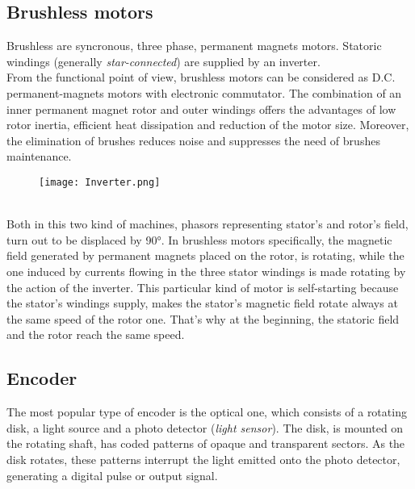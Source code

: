 \documentclass[12pt]{article}
\begin{document}
\subsection{Brushless motors}
Brushless are syncronous, three phase, permanent magnets motors.
Statoric windings (generally \textit{star-connected}) are supplied by an inverter.\\
From the functional point of view, brushless motors can be considered as D.C. permanent-magnets motors with electronic commutator.
The combination of an inner permanent magnet rotor and outer windings offers the advantages of low rotor inertia, efficient heat dissipation and reduction of the motor size. Moreover, the elimination of brushes reduces noise and suppresses the need of brushes maintenance.
\begin{figure}[h]
\centering
\texttt{[image: Inverter.png]}
\caption{\label{fig:ciao}}
\end{figure}\\
Both in this two kind of machines, phasors representing stator's and rotor's field, turn out to be displaced by 90°.
In brushless motors specifically, the magnetic field generated by permanent magnets placed on the rotor, is rotating, while the one induced by currents flowing in the three stator windings is made rotating by the action of the inverter.  
This particular kind of motor is self-starting because the stator's windings supply, makes the stator's magnetic field rotate always at the same speed of the rotor one.
That's why at the beginning, the statoric field and the rotor reach the same speed.
\subsection{Encoder}
The most popular type of encoder is the optical one, which 
consists of a rotating disk, a light source and a photo detector (\textit{light sensor}). The disk, is 
mounted on the rotating shaft, has coded patterns of opaque and transparent sectors. As the 
disk rotates, these patterns interrupt the light emitted onto the photo detector, generating a 
digital pulse or output signal.
\end{document}
